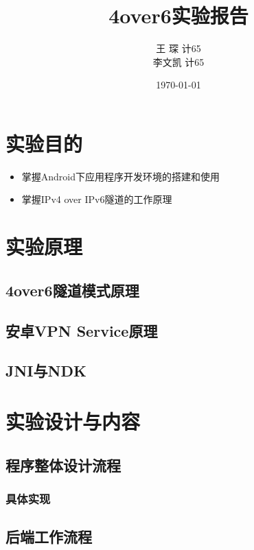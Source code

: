 \documentclass[paper=a4, fontsize=11pt, UTF8]{article} %
\title{\fontsize{18}\baselineskip 4over6实验报告}
\author{王 \; 琛 \quad 2016011360 \quad 计65\\ 李文凯\quad 2016011364 \quad 计65}
\date{\normalsize\today} %
\begin{document}
\maketitle %

\fontsize{11pt}{18pt}\selectfont

\section{实验目的}

\begin{itemize}
\item 掌握Android下应用程序开发环境的搭建和使用
\item 掌握IPv4 over IPv6隧道的工作原理
\end{itemize}


\section{实验原理}

\subsection{4over6隧道模式原理}

\subsection{安卓VPN Service原理}

\subsection{JNI与NDK}



\section{实验设计与内容}

\subsection{程序整体设计流程}

\subsubsection{具体实现}

\subsection{后端工作流程}
\end{document}
